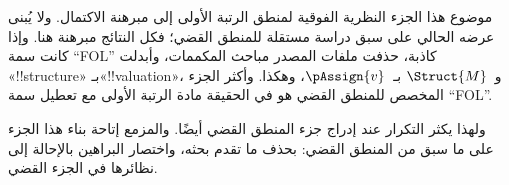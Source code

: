 \documentclass[../../include/open-logic-part]{subfiles}
\begin{document}

\begin{editorial}
  موضوع هذا الجزء النظرية الفوقية لمنطق الرتبة الأولى إلى مبرهنة
  الاكتمال. ولا يُبنى عرضه الحالي على سبق دراسة مستقلة للمنطق القضي؛
  فكل النتائج مبرهنة هنا. وإذا كانت سمة ``FOL'' كاذبة، حذفت ملفات
  المصدر مباحث المكممات، وأبدلت «!!{structure}» بـ«!!{valuation}»،
  و~$\Struct{M}$ بـ~$\pAssign{v}$، وهكذا. وأكثر الجزء المخصص
  للمنطق القضي هو في الحقيقة مادة الرتبة الأولى مع تعطيل سمة
  ``FOL''.

  ولهذا يكثر التكرار عند إدراج جزء المنطق القضي أيضًا. والمزمع إتاحة
  بناء هذا الجزء على ما سبق من المنطق القضي: بحذف ما تقدم بحثه،
  واختصار البراهين بالإحالة إلى نظائرها في الجزء القضي.
\end{editorial}












\OLEndPartHook
\end{document}
